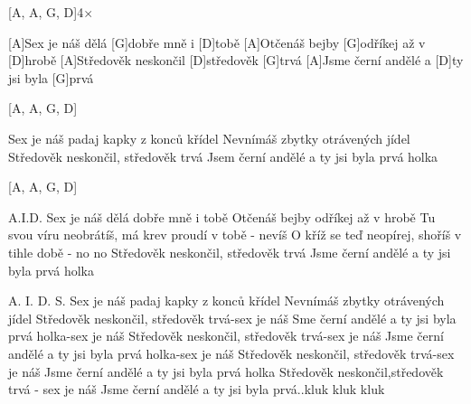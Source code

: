 [A, A, G, D]4$\times$
 
[A]Sex je náš dělá [G]dobře mně i [D]tobě 
[A]Otčenáš bejby [G]odříkej až v [D]hrobě 
[A]Středověk neskončil [D]středověk [G]trvá 
[A]Jsme černí andělé a [D]ty jsi byla [G]prvá 

[A, A, G, D] 
 
Sex je náš padaj kapky z konců křídel 
Nevnímáš zbytky otrávených jídel 
Středověk neskončil, středověk trvá 
Jsem černí andělé a ty jsi byla prvá holka 
 
[A, A, G, D] 

A.I.D. 
Sex je náš dělá dobře mně i tobě 
Otčenáš bejby odříkej až v hrobě 
Tu svou víru neobrátíš, má krev proudí v tobě - nevíš 
O kříž se teď neopírej, shoříš v tihle době - no no 
Středověk neskončil, středověk trvá 
Jsme černí andělé a ty jsi byla prvá holka 
 
A. I. D. S. 
Sex je náš padaj kapky z konců křídel 
Nevnímáš zbytky otrávených jídel 
Středověk neskončil, středověk trvá-sex je náš 
Sme černí andělé a ty jsi byla prvá holka-sex je náš 
Středověk neskončil, středověk trvá-sex je náš 
Jsme černí andělé a ty jsi byla prvá holka-sex je náš 
Středověk neskončil, středověk trvá-sex je náš 
Jsme černí andělé a ty jsi byla prvá holka 
Středověk neskončil,středověk trvá - sex je náš 
Jsme černí andělé a ty jsi byla prvá..kluk kluk kluk


